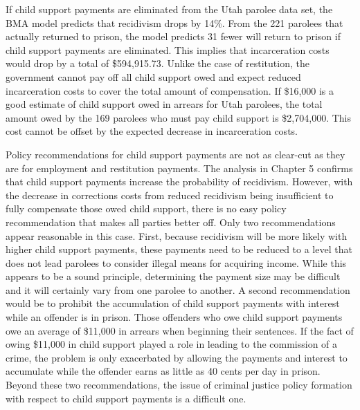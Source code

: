 If child support payments are eliminated from the Utah parolee data set, the BMA model predicts that recidivism drops by 14\%.  From the 221 parolees that actually returned to prison, the model predicts 31 fewer will return to prison if child support payments are eliminated.  This implies that incarceration costs would drop by a total of \$594,915.73.  Unlike the case of restitution, the government cannot pay off all child support owed and expect reduced incarceration costs to cover the total amount of compensation.  If \$16,000 is a good estimate of child support owed in arrears for Utah parolees, the total amount owed by the 169 parolees who must pay child support is \$2,704,000.  This cost cannot be offset by the expected decrease in incarceration costs.

Policy recommendations for child support payments are not as clear-cut as they are for employment and restitution payments.  The analysis in Chapter 5 confirms that child support payments increase the probability of recidivism.  However, with the decrease in corrections costs from reduced recidivism being insufficient to fully compensate those owed child support, there is no easy policy recommendation that makes all parties better off.  Only two recommendations appear reasonable in this case.  First, because recidivism will be more likely with higher child support payments, these payments need to be reduced to a level that does not lead parolees to consider illegal means for acquiring income.  While this appears to be a sound principle, determining the payment size may be difficult and it will certainly vary from one parolee to another.  A second recommendation would be to prohibit the accumulation of child support payments with interest while an offender is in prison.  Those offenders who owe child support payments owe an average of \$11,000 in arrears when beginning their sentences.  If the fact of owing \$11,000 in child support played a role in leading to the commission of a crime, the problem is only exacerbated by allowing the payments and interest to accumulate while the offender earns as little as 40 cents per day in prison.  Beyond these two recommendations, the issue of criminal justice policy formation with respect to child support payments is a difficult one.

